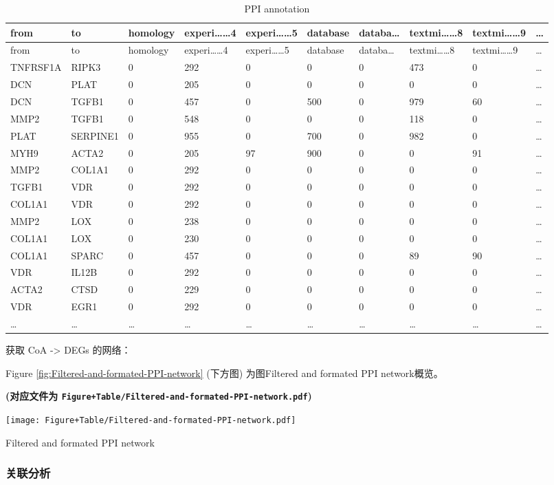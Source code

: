 \documentclass[
]{article}
\begin{document}
\begin{longtable}[]{@{}llllllllll@{}}
\caption{\label{tab:PPI-annotation}PPI annotation}\tabularnewline
\toprule
from & to & homology & experi\ldots\ldots4 & experi\ldots\ldots5 & database & databa\ldots{} & textmi\ldots\ldots8 & textmi\ldots\ldots9 & \ldots{}\tabularnewline
\midrule
\endfirsthead
\toprule
from & to & homology & experi\ldots\ldots4 & experi\ldots\ldots5 & database & databa\ldots{} & textmi\ldots\ldots8 & textmi\ldots\ldots9 & \ldots{}\tabularnewline
\midrule
\endhead
TNFRSF1A & RIPK3 & 0 & 292 & 0 & 0 & 0 & 473 & 0 & \ldots{}\tabularnewline
DCN & PLAT & 0 & 205 & 0 & 0 & 0 & 0 & 0 & \ldots{}\tabularnewline
DCN & TGFB1 & 0 & 457 & 0 & 500 & 0 & 979 & 60 & \ldots{}\tabularnewline
MMP2 & TGFB1 & 0 & 548 & 0 & 0 & 0 & 118 & 0 & \ldots{}\tabularnewline
PLAT & SERPINE1 & 0 & 955 & 0 & 700 & 0 & 982 & 0 & \ldots{}\tabularnewline
MYH9 & ACTA2 & 0 & 205 & 97 & 900 & 0 & 0 & 91 & \ldots{}\tabularnewline
MMP2 & COL1A1 & 0 & 292 & 0 & 0 & 0 & 0 & 0 & \ldots{}\tabularnewline
TGFB1 & VDR & 0 & 292 & 0 & 0 & 0 & 0 & 0 & \ldots{}\tabularnewline
COL1A1 & VDR & 0 & 292 & 0 & 0 & 0 & 0 & 0 & \ldots{}\tabularnewline
MMP2 & LOX & 0 & 238 & 0 & 0 & 0 & 0 & 0 & \ldots{}\tabularnewline
COL1A1 & LOX & 0 & 230 & 0 & 0 & 0 & 0 & 0 & \ldots{}\tabularnewline
COL1A1 & SPARC & 0 & 457 & 0 & 0 & 0 & 89 & 90 & \ldots{}\tabularnewline
VDR & IL12B & 0 & 292 & 0 & 0 & 0 & 0 & 0 & \ldots{}\tabularnewline
ACTA2 & CTSD & 0 & 229 & 0 & 0 & 0 & 0 & 0 & \ldots{}\tabularnewline
VDR & EGR1 & 0 & 292 & 0 & 0 & 0 & 0 & 0 & \ldots{}\tabularnewline
\ldots{} & \ldots{} & \ldots{} & \ldots{} & \ldots{} & \ldots{} & \ldots{} & \ldots{} & \ldots{} & \ldots{}\tabularnewline
\bottomrule
\end{longtable}

获取 CoA -\textgreater{} DEGs 的网络：

Figure \ref{fig:Filtered-and-formated-PPI-network} (下方图) 为图Filtered and formated PPI network概览。

\textbf{(对应文件为 \texttt{Figure+Table/Filtered-and-formated-PPI-network.pdf})}

\def\@captype{figure}
\begin{center}
\texttt{[image: Figure+Table/Filtered-and-formated-PPI-network.pdf]}
\caption{Filtered and formated PPI network}\label{fig:Filtered-and-formated-PPI-network}
\end{center}

\hypertarget{cor}{%
\subsubsection{关联分析}\label{cor}}
\end{document}
